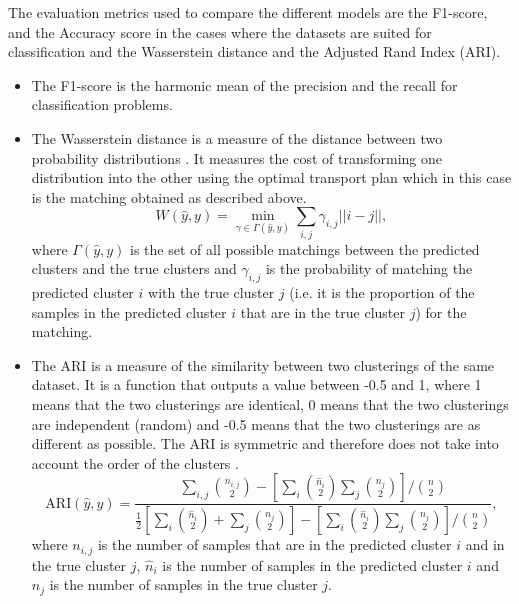 \documentclass[a4paper,12pt]{article}
\newcommand{\norm}[1]{\ensuremath{\left|\left|#1\right|\right|}}
\begin{document}
The evaluation metrics used to compare the different models are the F1-score, and the Accuracy score in the cases where the datasets are suited for classification and the Wasserstein distance and the Adjusted Rand Index (ARI). %
\begin{itemize}
    \item The F1-score is the harmonic mean of the precision and the recall for classification problems.
    \item The Wasserstein distance is a measure of the distance between two probability distributions \citep{ramdas2017wasserstein}. 
        It measures the cost of transforming one distribution into the other using the optimal transport plan which in this case is the matching obtained as described above.
        \begin{equation}
            W(\hat{y}, y) = \min_{\gamma \in \Gamma(\hat{y}, y)} \sum_{i, j} \gamma_{i, j} \norm{i - j}
        ,\end{equation}
    where $\Gamma(\hat{y}, y)$ is the set of all possible matchings between the predicted clusters and the true clusters and $\gamma_{i, j}$ is the probability of matching the predicted cluster $i$ with the true cluster $j$ (i.e. it is the proportion of the samples in the predicted cluster $i$ that are in the true cluster $j$) for the matching.
\item The ARI is a measure of the similarity between two clusterings of the same dataset. It is a function that outputs a value between -0.5 and 1, where 1 means that the two clusterings are identical, 0 means that the two clusterings are independent (random) and -0.5 means that the two clusterings are as different as possible. The ARI is symmetric and therefore does not take into account the order of the clusters \citep{steinley2004properties}. 
    \begin{equation}
    \text{ARI}(\hat{y}, y) = \frac{\sum_{i, j} \binom{n_{i, j}}{2} - \left[\sum_i \binom{\hat{n}_i}{2} \sum_j \binom{n_j}{2}\right] / \binom{n}{2}}{\frac{1}{2} \left[\sum_i \binom{\hat{n}_i}{2} + \sum_j \binom{n_j}{2}\right] - \left[\sum_i \binom{\hat{n}_i}{2} \sum_j \binom{n_j}{2}\right] / \binom{n}{2}}
    ,\end{equation}
where $n_{i, j}$ is the number of samples that are in the predicted cluster $i$ and in the true cluster $j$, $\hat{n}_i$ is the number of samples in the predicted cluster $i$ and $n_j$ is the number of samples in the true cluster $j$.
\end{itemize}
\end{document}
